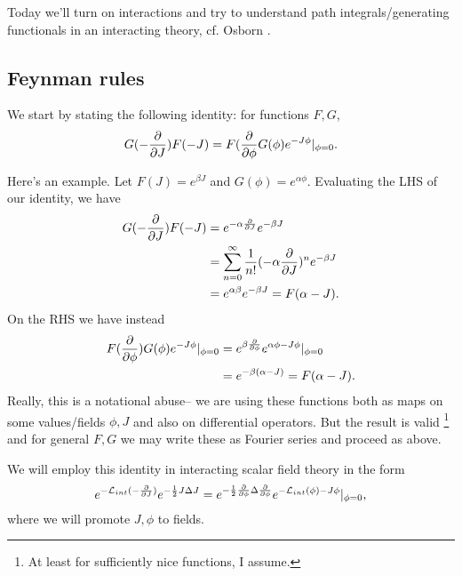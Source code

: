 Today we'll turn on interactions and try to understand path integrals/generating functionals in an interacting theory, cf. Osborn .
\subsection*{Feynman rules}
We start by stating the following identity: for functions $F,G$,
\begin{equation}
    G(-\P{}{J})F(-J) = F(\P{}{\phi}G(\phi)e^{-J\phi}|_{\phi=0}.
\end{equation}

\begin{exm}
    Here's an example. Let $F(J)=e^{\beta J}$ and $G(\phi)=e^{\alpha \phi}$. Evaluating the LHS of our identity, we have
    \begin{align*}
        G(-\P{}{J})F(-J) &= e^{-\alpha \P{}{J}}e^{-\beta J}\\
            &= \sum_{n=0}^\infty \frac{1}{n!} (-\alpha \P{}{J})^n e^{-\beta J}\\
            &= e^{\alpha \beta} e^{-\beta J} = F(\alpha-J).
    \end{align*}
    On the RHS we have instead
    \begin{align*}
        F(\P{}{\phi}) G(\phi)e^{-J\phi}|_{\phi=0} &= e^{\beta \P{}{\phi}}e^{\alpha \phi - J \phi}|_{\phi = 0}\\
            &= e^{-\beta(\alpha-J)} =F(\alpha-J).
    \end{align*}
    Really, this is a notational abuse-- we are using these functions both as maps on some values/fields $\phi,J$ and also on differential operators. But the result is valid%
        \footnote{At least for sufficiently nice functions, I assume.}
    and for general $F,G$ we may write these as Fourier series and proceed as above.
\end{exm}

We will employ this identity in interacting scalar field theory in the form
\begin{equation}\label{interactinglagrangianidentity}
    e^{-\cL_{int} (-\P{}{J})} e^{-\frac{1}{2} J\Delta J} = e^{-\frac{1}{2}\P{}{\phi} \Delta \P{}{\phi}} e^{-\cL_{int}(\phi)-J\phi}|_{\phi=0},
\end{equation}
where we will promote $J,\phi$ to fields.

